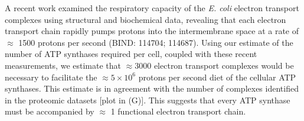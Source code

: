 A recent work \citep{szenk2017} examined the respiratory capacity of the \textit{E. coli}
electron transport complexes using structural and biochemical data, revealing
that each electron transport chain rapidly pumps protons into the
intermembrane space at a rate of $\approx$ 1500 protons per second (BIND:
114704; 114687). Using our estimate of the number of ATP synthases required
per cell, coupled with these recent
measurements, we estimate that $\approx 3000$ electron transport complexes
would be necessary to facilitate the $\approx 5 \times 10^6$ protons per second
diet of the cellular ATP synthases. This estimate is in agreement with the
number of complexes identified in the proteomic datasets [plot in
(G)]. This suggests that every ATP synthase must be
accompanied by $\approx$ 1 functional electron transport chain.

%


